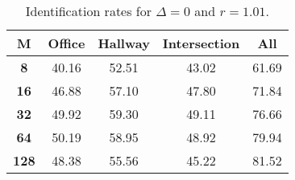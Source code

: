 \begin{table}[h]
    \footnotesize
    \centering
    \begin{tabular}{|c|c|c|c|l|}    
    \hline
    {\bf M} & {\bf Office} & {\bf Hallway} & {\bf Intersection} &     \multicolumn{1}{c|}{{\bf All}} \\ \hline
    {\bf 8} & 40.16 & 52.51 & 43.02 & 61.69 \\ \hline
    {\bf 16} & 46.88 & 57.10 & 47.80 & 71.84 \\ \hline
    {\bf 32} & 49.92 & 59.30 & 49.11 & 76.66 \\ \hline
    {\bf 64} & 50.19 & 58.95 & 48.92 & 79.94 \\ \hline
    {\bf 128} & 48.38 & 55.56 & 45.22 & 81.52 \\ \hline
    \end{tabular}
    \caption{Identification rates for $\Delta = 0$ and $r = 1.01$.}    
    \label{tab:identify_speakers_1.01_mit_19_0}
\end{table}
